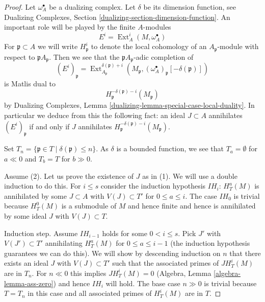 \documentclass{stacks-project}
\theoremstyle{plain}
\theoremstyle{definition}
\theoremstyle{remark}
\numberwithin{equation}{subsection}
\def\Ext{\mathop{\mathrm{Ext}}\nolimits}
\begin{document}
\begin{proof}
Let $\omega_A^\bullet$ be a dualizing complex. Let $\delta$ be its
dimension function, see Dualizing Complexes, Section
\ref{dualizing-section-dimension-function}.
An important role will be played by the finite $A$-modules
$$
E^i = \Ext_A^i(M, \omega_A^\bullet)
$$
For $\mathfrak p \subset A$ we will write $H^i_\mathfrak p$ to denote the
local cohomology of an $A_\mathfrak p$-module with respect to
$\mathfrak pA_\mathfrak p$. Then we see that
the $\mathfrak pA_\mathfrak p$-adic completion of
$$
(E^i)_\mathfrak p =
\Ext^{\delta(\mathfrak p) + i}_{A_\mathfrak p}(M_\mathfrak p,
(\omega_A^\bullet)_\mathfrak p[-\delta(\mathfrak p)])
$$
is Matlis dual to
$$
H^{-\delta(\mathfrak p) - i}_{\mathfrak p}(M_\mathfrak p)
$$
by
Dualizing Complexes, Lemma \ref{dualizing-lemma-special-case-local-duality}.
In particular we deduce from this the
following fact: an ideal $J \subset A$ annihilates
$(E^i)_\mathfrak p$ if and only if $J$ annihilates
$H^{-\delta(\mathfrak p) - i}_{\mathfrak p}(M_\mathfrak p)$.

\medskip\noindent
Set $T_n = \{\mathfrak p \in T \mid \delta(\mathfrak p) \leq n\}$.
As $\delta$ is a bounded function, we see that
$T_a = \emptyset$ for $a \ll 0$ and $T_b = T$ for $b \gg 0$.

\medskip\noindent
Assume (2). Let us prove the existence of $J$ as in (1).
We will use a double induction to do this. For $i \leq s$
consider the induction hypothesis $IH_i$:
$H^a_T(M)$ is annihilated by some $J \subset A$ with $V(J) \subset T'$
for $0 \leq a \leq i$. The case $IH_0$ is trivial
because $H^0_T(M)$ is a submodule of $M$ and hence finite
and hence is annihilated by some ideal $J$ with $V(J) \subset T$.

\medskip\noindent
Induction step. Assume $IH_{i - 1}$ holds for some $0 < i \leq s$.
Pick $J'$ with $V(J') \subset T'$ annihilating $H^a_T(M)$ for
$0 \leq a \leq i - 1$ (the induction hypothesis guarantees we can
do this). We will show by descending induction on $n$
that there exists an ideal $J$ with $V(J) \subset T'$ such that the
associated primes of $J H^i_T(M)$ are in $T_n$.
For $n \ll 0$ this implies $JH^i_T(M) = 0$ 
(Algebra, Lemma \ref{algebra-lemma-ass-zero})
and hence $IH_i$ will hold.
The base case $n \gg 0$ is trivial because $T = T_n$ in this case
and all associated primes of $H^i_T(M)$ are in $T$.


\end{proof}
\end{document}
